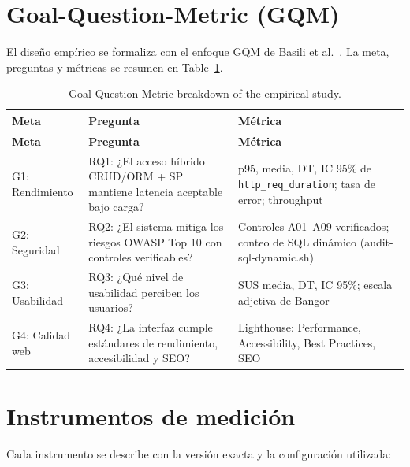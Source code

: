 \section{Goal-Question-Metric (GQM)}
\label{sec:gqm}

El diseño empírico se formaliza con el enfoque GQM de Basili et al.~\cite{basili1994}. La meta, preguntas y métricas se resumen en Table~\ref{tab:gqm}.

\begin{longtable}{@{}p{3cm}p{4.5cm}p{5cm}@{}}
\caption{Goal-Question-Metric breakdown of the empirical study.}
\label{tab:gqm}\\
\toprule
\textbf{Meta} & \textbf{Pregunta} & \textbf{Métrica} \\
\midrule
\endfirsthead
\toprule
\textbf{Meta} & \textbf{Pregunta} & \textbf{Métrica} \\
\midrule
\endhead
G1: Rendimiento & RQ1: ¿El acceso híbrido CRUD/ORM + SP mantiene latencia aceptable bajo carga? & p95, media, DT, IC 95\% de \texttt{http\_req\_duration}; tasa de error; throughput \\
\midrule
G2: Seguridad & RQ2: ¿El sistema mitiga los riesgos OWASP Top 10 con controles verificables? & Controles A01--A09 verificados; conteo de SQL dinámico (audit-sql-dynamic.sh) \\
\midrule
G3: Usabilidad & RQ3: ¿Qué nivel de usabilidad perciben los usuarios? & SUS media, DT, IC 95\%; escala adjetiva de Bangor \\
\midrule
G4: Calidad web & RQ4: ¿La interfaz cumple estándares de rendimiento, accesibilidad y SEO? & Lighthouse: Performance, Accessibility, Best Practices, SEO \\
\bottomrule
\end{longtable}

\section{Instrumentos de medición}
\label{sec:instrumentos}

Cada instrumento se describe con la versión exacta y la configuración utilizada:

